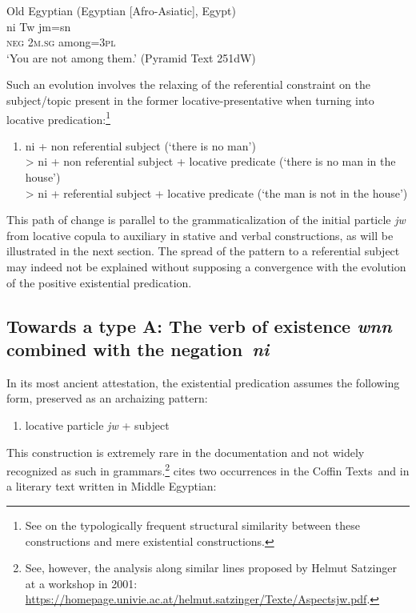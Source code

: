 \documentclass[output=paper]{langsci/langscibook}
\begin{document}
\ea Old Egyptian (Egyptian [Afro-Asiatic], Egypt) \label{ex:AE11}\\
	\gll ni Tw jm=sn\\
	\textsc{neg} \textsc{2m.sg} among=\textsc{3pl}\\
	\glt ‘You are not among them.’ (Pyramid Text 251dW)
\z 

Such an evolution involves the relaxing of the referential constraint on the subject/topic present in the former locative-presentative when turning into locative predication:\footnote{See \citet[108]{Veselinova2013} on the typologically frequent structural similarity between these constructions and mere existential constructions.}

\begin{enumerate}[label=(\roman*), resume] %
	\item ni + non referential subject (`there is no man')\\
	> ni + non referential subject + locative predicate (`there is no man in the house')\\
	> ni + referential subject + locative predicate (`the man is not in the house')
\end{enumerate}

This path of change is parallel to the grammaticalization of the initial particle \textit{jw} from locative copula to auxiliary in stative and verbal constructions, as will be illustrated in the next section. The spread of the pattern to a referential subject may indeed not be explained without supposing a convergence with the evolution of the positive existential predication.

\subsection{Towards a type A: The verb of existence \textit{wnn} combined with the negation \textit{ni}}\label{s:AE2-2}

In its most ancient attestation, the existential predication assumes the following form, preserved as an archaizing pattern: 

\begin{enumerate}[label=(\roman*), resume] %
	\item locative particle \textit{jw} + subject	
\end{enumerate}

This construction is extremely rare in the documentation and not widely recognized as such in grammars.\footnote{See, however, the analysis along similar lines proposed by Helmut Satzinger at a workshop in 2001: \url{https://homepage.univie.ac.at/helmut.satzinger/Texte/Aspectsjw.pdf}.} \citet[122]{Loprieno1995} cites two occurrences in the Coffin Texts and in a literary text written in Middle Egyptian:
\end{document}
